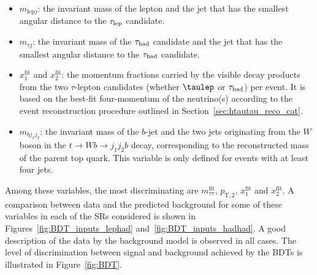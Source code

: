 \begin{itemize}
\item $m_{\text{lep}j}$: the invariant mass of the lepton and the jet that has the smallest angular distance to the $\tau_{\mathrm{lep}}$ candidate.
\item $m_{\tau j}$: the invariant mass of the  $\tau_{\mathrm{had}}$ candidate and the jet that has the smallest angular distance to the $\tau_{\mathrm{had}}$ candidate.
\item $x_{1}^{\text{fit}}$ and $x_{2}^{\text{fit}}$: the momentum fractions carried by the visible decay products from the two $\tau$-lepton candidates 
(whether $\taulep$ or $\tau_{\mathrm{had}}$) per event. It is based on the best-fit four-momentum of the neutrino(s) according to the event reconstruction procedure outlined in Section~\ref{sec:htautau_reco_cat}.
\item $m_{bj_1j_2}$: the invariant mass of the $b$-jet and the two jets originating from the $W$ boson in the $t\to Wb \to j_1j_2b$ decay, corresponding to the reconstructed mass of the parent top quark. This variable is only defined for events with at least four jets.
\end{itemize}

Among these variables, the most discriminating are $m_{\tau\tau}^{\text{fit}}$, $p_{\text{T},2}$, $x_{1}^{\text{fit}}$ and $x_{2}^{\text{fit}}$. A comparison between data and the predicted background for some of these variables in each of the SRs considered is shown in Figures~\ref{fig:BDT_inputs_lephad} and~\ref{fig:BDT_inputs_hadhad}.
A good description of the data by the background model is observed in all cases.
The level of discrimination between signal and background achieved by the BDTs is illustrated in Figure~\ref{fig:BDT}.

